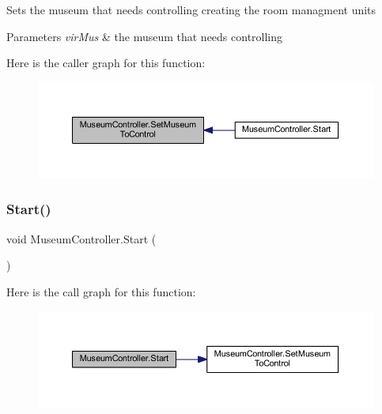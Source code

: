 Sets the museum that needs controlling creating the room managment units 


\begin{DoxyParams}{Parameters}
{\em vir\+Mus} & the museum that needs controlling\\
\hline
\end{DoxyParams}
Here is the caller graph for this function\+:
\nopagebreak
\begin{figure}[H]
\begin{center}
\leavevmode
\includegraphics[width=350pt]{class_museum_controller_a276d26ec047cda4e6f36b29fb673d968_icgraph}
\end{center}
\end{figure}
\mbox{\label{class_museum_controller_a3c48dd82fe1c3b55ee978ced6095f84e}} 
\subsubsection{\texorpdfstring{Start()}{Start()}}
{\footnotesize\ttfamily void Museum\+Controller.\+Start (\begin{DoxyParamCaption}{ }\end{DoxyParamCaption})\hspace{0.3cm}{\ttfamily [private]}}

Here is the call graph for this function\+:
\nopagebreak
\begin{figure}[H]
\begin{center}
\leavevmode
\includegraphics[width=350pt]{class_museum_controller_a3c48dd82fe1c3b55ee978ced6095f84e_cgraph}
\end{center}
\end{figure}
\mbox{\label{class_museum_controller_aa65b2ea9f99d62431282233f0582fc4a}} 
